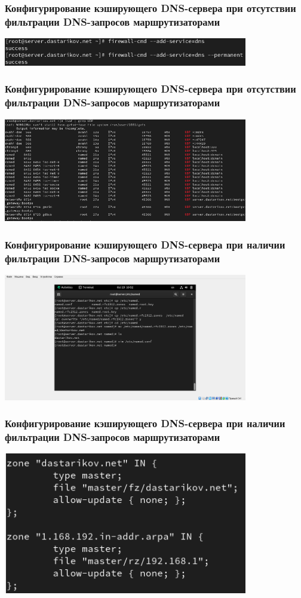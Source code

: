 \begin{frame}
\frametitle{Конфигурирование кэширующего DNS-сервера при отсутствии фильтрации DNS-запросов маршрутизаторами}
    \centering
    \includegraphics[width=0.8\textwidth]{../images/image06.png}
\end{frame}


\begin{frame}
\frametitle{Конфигурирование кэширующего DNS-сервера при отсутствии фильтрации DNS-запросов маршрутизаторами}
    \centering
    \includegraphics[width=0.8\textwidth]{../images/image07.png}
\end{frame}


\begin{frame}
\frametitle{Конфигурирование кэширующего DNS-сервера при наличии фильтрации DNS-запросов маршрутизаторами}
    \centering
    \includegraphics[width=0.8\textwidth]{../images/image08.png}
\end{frame}


\begin{frame}
\frametitle{Конфигурирование кэширующего DNS-сервера при наличии фильтрации DNS-запросов маршрутизаторами}
    \centering
    \includegraphics[width=0.8\textwidth]{../images/image09.png}
\end{frame}


